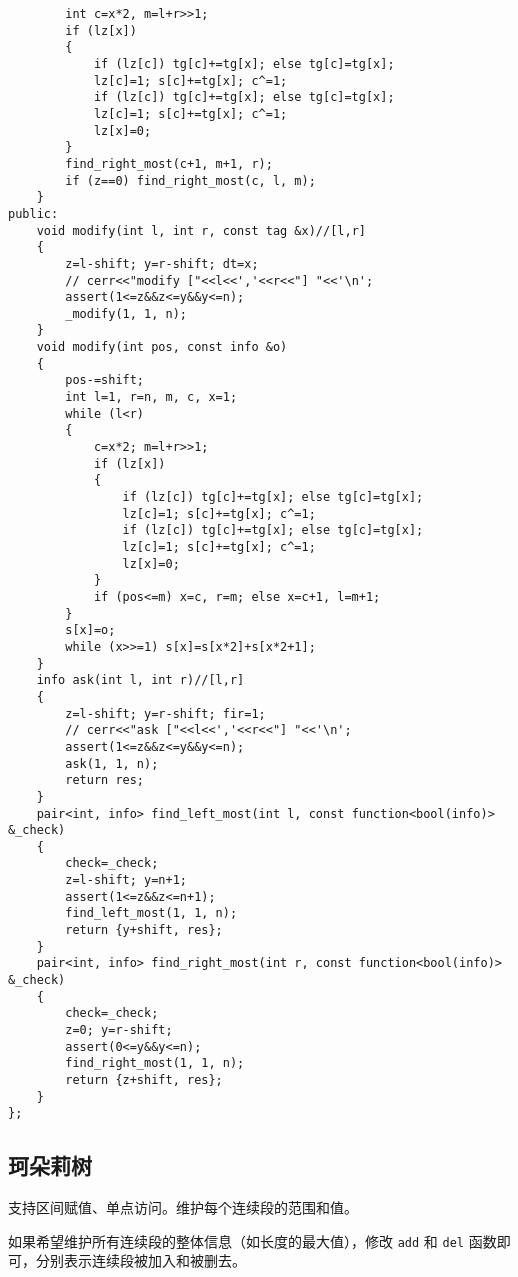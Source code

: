 \documentclass[12pt]{ctexart}
\begin{document}
\begin{lstlisting}
		int c=x*2, m=l+r>>1;
		if (lz[x])
		{
			if (lz[c]) tg[c]+=tg[x]; else tg[c]=tg[x];
			lz[c]=1; s[c]+=tg[x]; c^=1;
			if (lz[c]) tg[c]+=tg[x]; else tg[c]=tg[x];
			lz[c]=1; s[c]+=tg[x]; c^=1;
			lz[x]=0;
		}
		find_right_most(c+1, m+1, r);
		if (z==0) find_right_most(c, l, m);
	}
public:
	void modify(int l, int r, const tag &x)//[l,r]
	{
		z=l-shift; y=r-shift; dt=x;
		// cerr<<"modify ["<<l<<','<<r<<"] "<<'\n';
		assert(1<=z&&z<=y&&y<=n);
		_modify(1, 1, n);
	}
	void modify(int pos, const info &o)
	{
		pos-=shift;
		int l=1, r=n, m, c, x=1;
		while (l<r)
		{
			c=x*2; m=l+r>>1;
			if (lz[x])
			{
				if (lz[c]) tg[c]+=tg[x]; else tg[c]=tg[x];
				lz[c]=1; s[c]+=tg[x]; c^=1;
				if (lz[c]) tg[c]+=tg[x]; else tg[c]=tg[x];
				lz[c]=1; s[c]+=tg[x]; c^=1;
				lz[x]=0;
			}
			if (pos<=m) x=c, r=m; else x=c+1, l=m+1;
		}
		s[x]=o;
		while (x>>=1) s[x]=s[x*2]+s[x*2+1];
	}
	info ask(int l, int r)//[l,r]
	{
		z=l-shift; y=r-shift; fir=1;
		// cerr<<"ask ["<<l<<','<<r<<"] "<<'\n';
		assert(1<=z&&z<=y&&y<=n);
		ask(1, 1, n);
		return res;
	}
	pair<int, info> find_left_most(int l, const function<bool(info)> &_check)
	{
		check=_check;
		z=l-shift; y=n+1;
		assert(1<=z&&z<=n+1);
		find_left_most(1, 1, n);
		return {y+shift, res};
	}
	pair<int, info> find_right_most(int r, const function<bool(info)> &_check)
	{
		check=_check;
		z=0; y=r-shift;
		assert(0<=y&&y<=n);
		find_right_most(1, 1, n);
		return {z+shift, res};
	}
};
\end{lstlisting}


\subsection{珂朵莉树}
支持区间赋值、单点访问。维护每个连续段的范围和值。

如果希望维护所有连续段的整体信息（如长度的最大值），修改 \verb|add| 和 \verb|del| 函数即可，分别表示连续段被加入和被删去。
\end{document}
